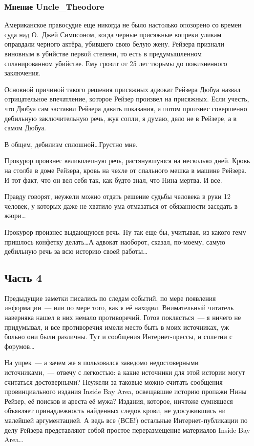 \subsubsection{Мнение Uncle\_Theodore}

Американское правосудие еще никогда не было настолько опозорено со времен суда над О.~Джей Симпсоном, когда черные присяжные вопреки уликам оправдали черного актёра, убившего свою белую жену. Рейзера признали виновным в убийстве первой степени, то есть в предумышленном спланированном убийстве. Ему грозит от 25 лет тюрьмы до пожизненного заключения. 

Основной причиной такого решения присяжных адвокат Рейзера Дюбуа назвал отрицательное впечатление, которое Рейзер произвел на присяжных. Если учесть, что Дюбуа сам заставил Рейзера давать показания, а потом произнес совершенно дебильную заключительную речь, жуя сопли, я думаю, дело не в Рейзере, а в самом Дюбуа. 

В общем, дебилизм сплошной\dots Грустно мне. 

Прокурор произнес великолепную речь, растянувшуюся на несколько дней. Кровь на столбе в доме Рейзера, кровь на чехле от спального мешка в машине Рейзера. И тот факт, что он вел себя так, как будто знал, что Нина мертва. И все. 

Правду говорят, неужели можно отдать решение судьбы человека в руки 12 человек, у которых даже не хватило ума отмазаться от обязанности заседать в жюри\dots 

Прокурор произнес выдающуюся речь. Ну так еще бы, учитывая, из какого г ему пришлось конфетку делать\dots А адвокат наоборот, сказал, по-моему, самую дебильную речь за всю историю своей работы\dots 

\subsection{Часть 4}

Предыдущие заметки писались по следам событий, по мере появления информации~--- или по мере того, как я её находил. Внимательный читатель наверняка нашел в них немало противоречий. Готов поклясться~--- я ничего не придумывал, и все противоречия имели место быть в моих источниках, уж больно они были различны. Тут и сообщения Интернет-прессы, и сплетни с форумов\dots 

На упрек~--- а зачем же я пользовался заведомо недостоверными источниками,~--- отвечу с легкостью: а какие источники для этой истории могут считаться достоверными? Неужели за таковые можно считать сообщения провинциального издания Inside Bay Area, освещавшие историю пропажи Нины Рейзер, её поисков и ареста её мужа? Издания, которое, ничтоже сумняшеся объявляет принадлежность найденных следов крови, не удосужившись ни малейшей аргументацией. А ведь все (ВСЕ!) остальные Интернет-публикации по делу Рейзера представляют собой простое переразмещение материалов Inside Bay Area\dots 

